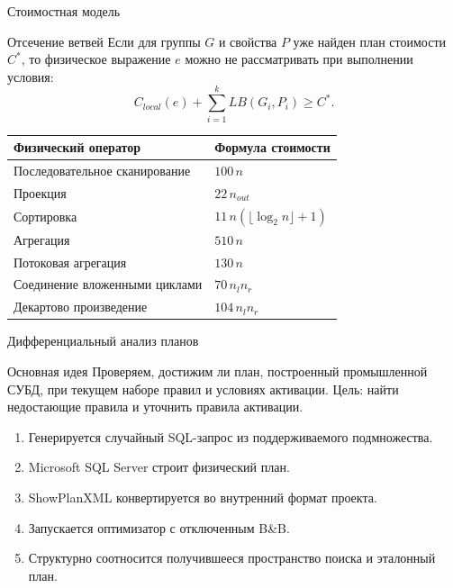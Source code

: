 \documentclass{beamer}
\begin{document}
\begin{frame}{Стоимостная модель}
\begin{block}{Отсечение ветвей}
Если для группы \(G\) и свойства \(P\) уже найден план стоимости \(C^*\), то
физическое выражение \(e\) можно не рассматривать при выполнении условия:
\[
  C_{local}(e) + \sum_{i=1}^{k} LB(G_i, P_i) \geq C^*.
\]
\end{block}

\begin{center}
\scriptsize
\begin{tabular}{@{}ll@{}}
\toprule
Физический оператор & Формула стоимости \\
\midrule
Последовательное сканирование & \(100\,n\) \\
Проекция & \(22\,n_{out}\) \\
Сортировка & \(11\,n(\lfloor\log_2 n\rfloor + 1)\) \\
Агрегация & \(510\,n\) \\
Потоковая агрегация & \(130\,n\) \\
Соединение вложенными циклами & \(70\,n_l n_r\) \\
Декартово произведение & \(104\,n_l n_r\) \\
\bottomrule
\end{tabular}
\end{center}
\end{frame}

\begin{frame}{Дифференциальный анализ планов}
\begin{block}{Основная идея}
  Проверяем, достижим ли план, построенный промышленной СУБД, при текущем наборе
  правил и условиях активации. Цель: найти недостающие правила и уточнить
  правила активации.
\end{block}

\begin{enumerate}
  \item Генерируется случайный SQL-запрос из поддерживаемого подмножества.
  \item Microsoft SQL Server строит физический план.
  \item ShowPlanXML конвертируется во внутренний формат проекта.
  \item Запускается оптимизатор с отключенным B\&B.
  \item Структурно соотносится получившееся пространство поиска и эталонный план.
\end{enumerate}
\end{frame}
\end{document}
